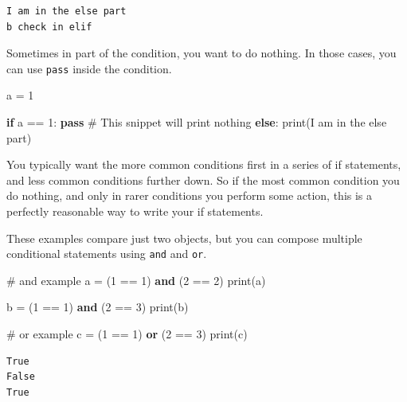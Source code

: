 \documentclass[
  letterpaper,
]{scrbook}
\newenvironment{Shaded}{\begin{snugshade}}{\end{snugshade}}
\newcommand{\BuiltInTok}[1]{\textcolor[rgb]{0.00,0.23,0.31}{#1}}
\newcommand{\CommentTok}[1]{\textcolor[rgb]{0.37,0.37,0.37}{#1}}
\newcommand{\ControlFlowTok}[1]{\textcolor[rgb]{0.00,0.23,0.31}{\textbf{#1}}}
\newcommand{\DecValTok}[1]{\textcolor[rgb]{0.68,0.00,0.00}{#1}}
\newcommand{\KeywordTok}[1]{\textcolor[rgb]{0.00,0.23,0.31}{\textbf{#1}}}
\newcommand{\NormalTok}[1]{\textcolor[rgb]{0.00,0.23,0.31}{#1}}
\newcommand{\OperatorTok}[1]{\textcolor[rgb]{0.37,0.37,0.37}{#1}}
\newcommand{\StringTok}[1]{\textcolor[rgb]{0.13,0.47,0.30}{#1}}
\begin{document}
\begin{verbatim}
I am in the else part
b check in elif
\end{verbatim}

Sometimes in part of the condition, you want to do nothing. In those
cases, you can use \texttt{pass} inside the condition.

\begin{Shaded}
\begin{Highlighting}[]
\NormalTok{a }\OperatorTok{=} \DecValTok{1}

\ControlFlowTok{if}\NormalTok{ a }\OperatorTok{==} \DecValTok{1}\NormalTok{:}
  \ControlFlowTok{pass} \CommentTok{\# This snippet will print nothing}
\ControlFlowTok{else}\NormalTok{:}
  \BuiltInTok{print}\NormalTok{(}\StringTok{\textquotesingle{}I am in the else part\textquotesingle{}}\NormalTok{)}
\end{Highlighting}
\end{Shaded}

You typically want the more common conditions first in a series of if
statements, and less common conditions further down. So if the most
common condition you do nothing, and only in rarer conditions you
perform some action, this is a perfectly reasonable way to write your if
statements.

These examples compare just two objects, but you can compose multiple
conditional statements using \texttt{and} and \texttt{or}.

\begin{Shaded}
\begin{Highlighting}[]
\CommentTok{\# and example}
\NormalTok{a }\OperatorTok{=}\NormalTok{ (}\DecValTok{1} \OperatorTok{==} \DecValTok{1}\NormalTok{) }\KeywordTok{and}\NormalTok{ (}\DecValTok{2} \OperatorTok{==} \DecValTok{2}\NormalTok{)}
\BuiltInTok{print}\NormalTok{(a)}

\NormalTok{b }\OperatorTok{=}\NormalTok{ (}\DecValTok{1} \OperatorTok{==} \DecValTok{1}\NormalTok{) }\KeywordTok{and}\NormalTok{ (}\DecValTok{2} \OperatorTok{==} \DecValTok{3}\NormalTok{)}
\BuiltInTok{print}\NormalTok{(b)}

\CommentTok{\# or example}
\NormalTok{c }\OperatorTok{=}\NormalTok{ (}\DecValTok{1} \OperatorTok{==} \DecValTok{1}\NormalTok{) }\KeywordTok{or}\NormalTok{ (}\DecValTok{2} \OperatorTok{==} \DecValTok{3}\NormalTok{)}
\BuiltInTok{print}\NormalTok{(c)}
\end{Highlighting}
\end{Shaded}

\begin{verbatim}
True
False
True
\end{verbatim}
\end{document}
